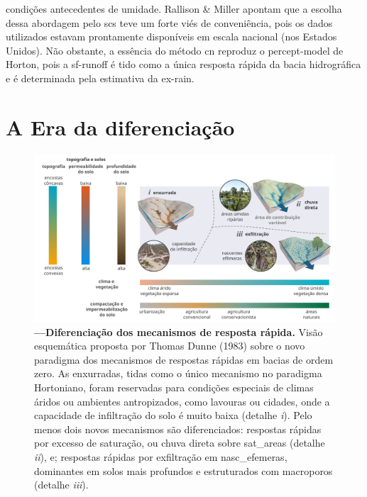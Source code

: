 \documentclass[./main.tex]{subfiles}
\begin{document}
condições antecedentes de umidade. Rallison \& Miller apontam que a escolha dessa abordagem pelo \acrshort{scs} teve um forte viés de conveniência, pois os dados utilizados estavam prontamente disponíveis em escala nacional (nos Estados Unidos). Não obstante, a essência do método \acrshort{cn} reproduz o \gls{percept-model} de Horton, pois a \gls{sf-runoff} é tido como a única resposta rápida da bacia hidrográfica e é determinada pela estimativa da \gls{ex-rain}. 

\section{A Era da diferenciação}

\begin{figure}[t!] 
\centering				
\includegraphics[width=0.98\linewidth]{figs/fig_processes.jpg}		
\caption[Diferenciação dos mecanismos de resposta rápida.]
{\textbf{---\;Diferenciação dos mecanismos de resposta rápida.}
    Visão esquemática proposta por Thomas Dunne (1983) \cite{Dunne1983} sobre o novo \gls{paradigma} dos mecanismos de respostas rápidas em bacias de ordem zero. As enxurradas, tidas como o único mecanismo no \gls{paradigma} Hortoniano, foram reservadas para condições especiais de climas áridos ou ambientes antropizados, como lavouras ou cidades, onde a capacidade de infiltração do solo é muito baixa (detalhe \textrm{\textit{i}}). Pelo menos dois novos mecanismos são diferenciados: respostas rápidas por excesso de saturação, ou chuva direta sobre \gls{sat_areas} (detalhe \textrm{\textit{ii}}), e; respostas rápidas por exfiltração em \gls{nasc_efemeras}, dominantes em solos mais profundos e estruturados com macroporos (detalhe \textrm{\textit{iii}}).
}
\label{fig:hydro:diff} 		
\end{figure}
\end{document}
